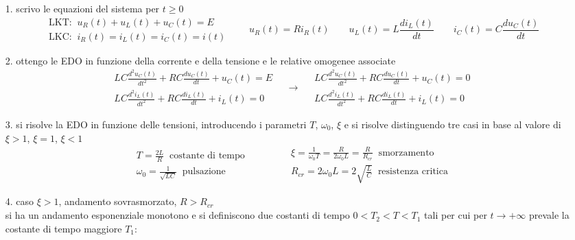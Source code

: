 \documentclass[a4paper]{article}
\begin{document}
\begin{itemize}[itemsep=0pt]
	\item[1.] scrivo le equazioni del sistema per \(t \geq 0\)
	\[\begin{array}{l}
		\text{LKT:} \;\; u_R(t) + u_L(t) + u_C(t) = E \\[7pt]
		\text{LKC:} \;\; i_R(t) = i_L(t) = i_C(t) = i(t)
	\end{array} \qquad u_R(t) = Ri_R(t) \qquad u_L(t) = L \frac{di_L(t)}{dt} \qquad i_C(t) = C \frac{du_C(t)}{dt}\]
	\item[2.] ottengo le EDO in funzione della corrente e della tensione e le relative omogenee associate
	\[\begin{array}{l}
		\displaystyle LC\frac{d^2u_C(t)}{dt^2} + RC\frac{du_C(t)}{dt} + u_C(t) = E \\[10pt]
		\displaystyle LC\frac{d^2i_L(t)}{dt^2} + RC\frac{di_L(t)}{dt} + i_L(t) = 0
	\end{array}
	\quad \rightarrow \quad \begin{array}{l}
		\displaystyle LC\frac{d^2u_C(t)}{dt^2} + RC\frac{du_C(t)}{dt} + u_C(t) = 0 \\[10pt]
		\displaystyle LC\frac{d^2i_L(t)}{dt^2} + RC\frac{di_L(t)}{dt} + i_L(t) = 0
	\end{array}\]
	\item[3.] si risolve la EDO in funzione delle tensioni, introducendo i parametri \(T\), \(\omega_0\), \(\xi\) e si risolve
	distinguendo tre casi in base al valore di \(\xi > 1\), \(\xi = 1\), \(\xi < 1\)
	\[\begin{array}{l}
		\displaystyle T = \frac{2L}{R} \;\; \text{costante di tempo} \\[10pt]
		\displaystyle \omega_0 = \frac{1}{\sqrt{LC}} \;\; \text{pulsazione}
	\end{array} \qquad\qquad \begin{array}{l}
		\displaystyle \xi = \frac{1}{\omega_0 T} = \frac{R}{2\omega_0 L} = \frac{R}{R_{cr}} \;\; \text{smorzamento} \\[10pt]
		\displaystyle R_{cr} = 2 \omega_0 L = 2\sqrt{\frac{L}{C}} \;\; \text{resistenza critica}
	\end{array}\]
	
	\item[4.] caso \(\xi > 1\), andamento sovrasmorzato, \(R > R_{cr}\) \\
	si ha un andamento esponenziale monotono e si definiscono due costanti di tempo \(0 < T_2 < T < T_1\) tali per cui per \(t \to +\infty\)
	prevale la costante di tempo maggiore \(T_1\):
	

\end{itemize}
\end{document}

